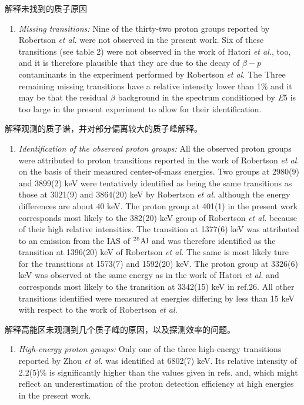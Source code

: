 \documentclass[a4paper]{article}
\begin{document}
解释未找到的质子原因
\begin{enumerate}
    \item \textit{Missing transitions:} Nine of the thirty-two proton groups reported by Robertson \textit{et al.} were not observed in the present work. Six of these transitions (see table 2) were not observed in the work of Hatori \textit{et al.}, too, and it is therefore plausible that they are due to the decay of $\beta-p$ contaminants in the experiment performed by Robertson \textit{et al.} The Three remaining missing transitions have a relative intensity lower than 1\% and it may be that the residual $\beta$ background in the spectrum conditioned by \textit{E}5 is too large in the present experiment to allow for their identification.
\end{enumerate}

解释观测的质子谱，并对部分偏离较大的质子峰解释。
\begin{enumerate}
    \item \textit{Identification of the observed proton groups:} All the observed proton groups were attributed to proton transitions reported in the work of Robertson \textit{et al.} on the basis of their measured center-of-mass energies. Two groups at 2980(9) and 3899(2) keV were tentatively identified as being the same transitions as those at 3021(9) and 3864(20) keV by Robertson \textit{et al.} although the energy differences are about 40 keV. The proton group at 401(1) in the present work corresponds most likely to the 382(20) keV group of Robertson \textit{et al.} because of their high relative intensities. The transition at 1377(6) keV was attributed to an emission from the IAS of $^{25}\textnormal{Al}$ and was therefore identified as the transition at 1396(20) keV of Robertson \textit{et al.} The same is most likely ture for the transitions at 1573(7) and 1592(20) keV. The proton group at 3326(6) keV was observed at the same energy as in the work of Hatori \textit{et al.} and corresponds most likely to the transition at 3342(15) keV in ref.26. All other transitions identified were measured at energies differing by less than 15 keV with respect to the work of Robertson \textit{et al.}
\end{enumerate}

解释高能区未观测到几个质子峰的原因，以及探测效率的问题。
\begin{enumerate}
    \item \textit{High-energy proton groups:} Only one of the three high-energy transitions reported by Zhou \textit{et al.} was identified at 6802(7) keV. Its relative intensity of 2.2(5)\% is significantly higher than the values given in refs. and, which might reflect an underestimation of the proton detection efficiency at high energies in the present work.
\end{enumerate}
\end{document}

